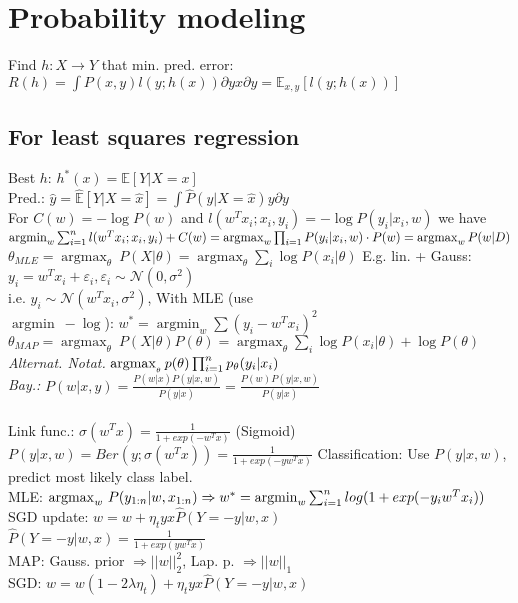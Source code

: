 \section*{Probability modeling}
Find $h:X\rightarrow Y$ that min. pred. error: 
$R(h) = \int P(x,y)l(y;h(x)) \partial yx \partial y = \mathbb{E}_{x,y}[l(y;h(x))]$

\subsection*{For least squares regression}
Best $h$: $h^*(x) = \mathbb{E}[Y|X=x]$ \\
Pred.: $\hat{y} = \hat{\mathbb{E}}[Y|X=\hat{x}] = \int \hat{P}(y|X=\hat{x}) y \partial y$\\
For $C(w) = - \log P(w)$ and $l(w^Tx_i;x_i,y_i) = - \log P(y_i|x_i,w)$ we have 
$\operatorname{argmin}_{w} \sum_{i=1}^{n} l (w^T x_i; x_i,y_i) + C(w) = \operatorname{argmax}_{w} \prod_{i=1} P(y_i|x_i,w) \cdot P(w) =  \operatorname{argmax}_{w} P(w|D)$\\
$\theta_{MLE} = \operatorname{argmax}_\theta ~ {P}(X| \theta) = \operatorname{argmax}_{\theta} \sum_i \log P(x_i|\theta)$ 
E.g. lin. + Gauss: $y_i = w^T x_i + \varepsilon_i, \varepsilon_i \sim \mathcal{N}(0, \sigma^2)$\\
i.e. $y_i \sim \mathcal{N}(w^T x_i, \sigma^2)$, With MLE (use\\ $\operatorname{argmin} ~ - \operatorname{log}$): $w^* = {\operatorname{argmin}_w} \sum (y_i-w^Tx_i)^2$\\
$\theta_{MAP} = \operatorname{argmax}_\theta ~ {P}(X| \theta) P(\theta) = \operatorname{argmax}_{\theta} \sum_i \log P(x_i|\theta) + \log P(\theta)$\\
\textit{Alternat. Notat.} $\operatorname{argmax}_{_\theta } p(\theta) \prod_{i=1}^n p_{\theta}(y_i|x_i) $\\
\textit{Bay.:} $P(w|x,y) = \frac{P(w|x) P(y|x,w)}{P(y|x)} = \frac{P(w) P(y|x,w)}{P(y|x)}$\\
\\
Link func.: $\sigma(w^Tx) = \frac{1}{1+exp(-w^Tx)}$ (Sigmoid)\\
$P(y|x,w) = Ber(y; \sigma(w^Tx)) = \frac{1}{1+exp(-y w^T x)}$
Classification: Use $P(y|x,w)$, predict most likely class label.\\
MLE: ${\operatorname{argmax}_w} ~ P(y_{1:n}|w,x_{1:n})\\
\Rightarrow w^* ={\operatorname{argmin}}_w \sum_{i=1}^n log(1+exp(-y_i w^T x_i))$\\
SGD update: $w = w + \eta_t y x \hat{P}(Y = -y|w,x)$\\
$\hat{P}(Y = -y|w,x) = \frac{1}{1+exp(yw^Tx)}$\\
MAP: Gauss. prior $\Rightarrow ||w||_2^2$, Lap. p. $\Rightarrow||w||_1$\\
SGD: $w = w (1-2\lambda \eta_t) + \eta_t y x \hat{P}(Y = -y|w,x)$